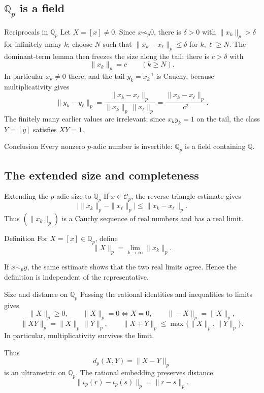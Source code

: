 \documentclass[aspectratio=169,11pt]{beamer}
\newcommand{\Q}{\mathbb Q}
\begin{document}
\subsection{\texorpdfstring{\(\Q_p\) is a field}{Qp is a field}}

\begin{frame}{Reciprocals in \(\Q_p\)}
  \small
  Let \(X=[x]\ne0\).  Since \(x\not\sim_p0\), there is \(\delta>0\) with
  \(\|x_k\|_p>\delta\) for infinitely many \(k\); choose \(N\) such that
  \(\|x_k-x_\ell\|_p\le\delta\) for \(k,\ell\ge N\).  The dominant-term
  lemma then freezes the size along the tail: there is \(c>\delta\) with
  \[
    \|x_k\|_p=c\qquad(k\ge N).
  \]
  In particular \(x_k\ne0\) there, and the tail \(y_k=x_k^{-1}\) is Cauchy,
  because multiplicativity gives
  \[
    \|y_k-y_\ell\|_p
      =\frac{\|x_k-x_\ell\|_p}{\|x_k\|_p\,\|x_\ell\|_p}
      =\frac{\|x_k-x_\ell\|_p}{c^2}.
  \]
  The finitely many earlier values are irrelevant; since \(x_ky_k=1\) on
  the tail, the class \(Y=[y]\) satisfies \(XY=1\).

  \begin{alertblock}{Conclusion}
    Every nonzero \(p\)-adic number is invertible:
    \(\Q_p\) is a field containing \(\Q\).
  \end{alertblock}
\end{frame}

\subsection{\texorpdfstring{The extended size and completeness}{The extended size and completeness}}

\begin{frame}{Extending the \(p\)-adic size to \(\Q_p\)}
  If \(x\in\mathcal C_p\), the reverse-triangle estimate gives
  \[
    \bigl|\|x_k\|_p-\|x_\ell\|_p\bigr|
      \le\|x_k-x_\ell\|_p.
  \]
  Thus \((\|x_k\|_p)\) is a Cauchy sequence of real numbers and has a real
  limit.

  \begin{block}{Definition}
    For \(X=[x]\in\Q_p\), define
    \[
      \boxed{\|X\|_p=\lim_{k\to\infty}\|x_k\|_p.}
    \]
  \end{block}

  If \(x\sim_p y\), the same estimate shows that the two real limits agree.
  Hence the definition is independent of the representative.
\end{frame}

\begin{frame}{Size and distance on \(\Q_p\)}
  Passing the rational identities and inequalities to limits gives
  \[
    \|X\|_p\ge0,
    \qquad
    \|X\|_p=0\Longleftrightarrow X=0,
    \qquad
    \|-X\|_p=\|X\|_p,
  \]
  \[
    \|XY\|_p=\|X\|_p\,\|Y\|_p,
    \qquad
    \|X+Y\|_p\le\max\{\|X\|_p,\|Y\|_p\}.
  \]
  In particular, multiplicativity survives the limit.

  Thus
  \[
    d_p(X,Y)=\|X-Y\|_p
  \]
  is an ultrametric on \(\Q_p\).  The rational embedding preserves distance:
  \[
    \|\iota_p(r)-\iota_p(s)\|_p=\|r-s\|_p.
  \]
\end{frame}
\end{document}
